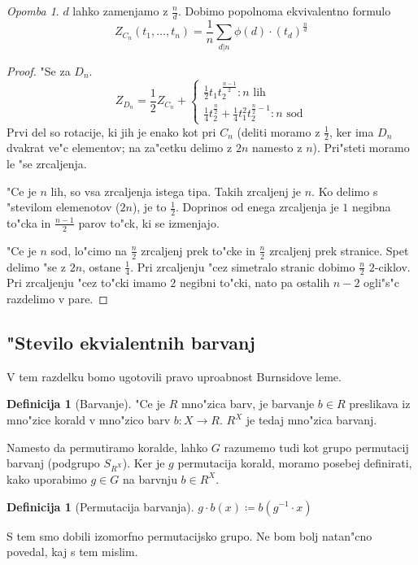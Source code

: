 \documentclass[a4paper,12pt]{article}
\theoremstyle{definition}
\newtheorem{defn}[counter]{Definicija}
\theoremstyle{remark}
\newtheorem*{rem}{Opomba}
\begin{document}
\begin{rem}
	$d$ lahko zamenjamo z $\frac{n}{d}$. Dobimo popolnoma ekvivalentno formulo
	\[Z_{C_n}(t_1, \ldots, t_n) = \frac{1}{n}\sum_{d|n}\phi(d) \cdot (t_d)^\frac{n}{d}\]
\end{rem}
\begin{proof}"Se za $D_n$.
	\[
	Z_{D_n} = \frac{1}{2}Z_{C_n} +
	\begin{cases}
		\frac{1}{2} t_1 t_2^{\frac{n-1}{2}}: n \text{ lih}
		\\
		\frac{1}{4} t_2^{\frac{n}{2}} + \frac{1}{4} t_1^2 t_2^{\frac{n}{2}-1}: n \text{ sod}
	\end{cases}
	\]
	Prvi del so rotacije, ki jih je enako kot pri $C_n$ (deliti moramo z $\frac{1}{2}$, ker ima $D_n$ dvakrat ve"c elementov; na za"cetku delimo z $2n$ namesto z $n$). Pri"steti moramo le "se zrcaljenja. 
	
	"Ce je $n$ lih, so vsa zrcaljenja istega tipa. Takih zrcaljenj je $n$. Ko delimo s "stevilom elemenotov ($2n$), je to $\frac{1}{2}$. Doprinos od enega zrcaljenja je $1$ negibna to"cka in $\frac{n-1}{2}$ parov to"ck, ki se izmenjajo.
	
	"Ce je $n$ sod, lo"cimo na $\frac{n}{2}$ zrcaljenj prek to"cke in $\frac{n}{2}$ zrcaljenj prek stranice. Spet delimo "se z $2n$, ostane $\frac{1}{4}$. Pri zrcaljenju "cez simetralo stranic dobimo $\frac{n}{2}$ $2$-ciklov. Pri zrcaljenju "cez to"cki imamo $2$ negibni to"cki, nato pa ostalih $n-2$ ogli"s"c razdelimo v pare.
\end{proof}





\subsection{"Stevilo ekvialentnih barvanj}
V tem razdelku bomo ugotovili pravo uproabnost Burnsidove leme.
\begin{defn}[Barvanje]
	"Ce je $R$ mno"zica barv, je barvanje $b \in R$ preslikava iz mno"zice korald v mno"zico barv
	$b : X \to R$.
	$R^X$ je tedaj mno"zica barvanj.
\end{defn}

Namesto da permutiramo koralde, lahko $G$ razumemo tudi kot grupo permutacij barvanj (podgrupo $S_{R^X}$). Ker je $g$ permutacija korald, moramo posebej definirati, kako uporabimo $g \in G$ na barvnju $b \in R^X$.
\begin{defn}[Permutacija barvanja]
	$g \cdot b(x) \coloneqq b (g^{-1} \cdot x)$
\end{defn}
S tem smo dobili izomorfno permutacijsko grupo. Ne bom bolj natan"cno povedal, kaj s tem mislim.
\end{document}
